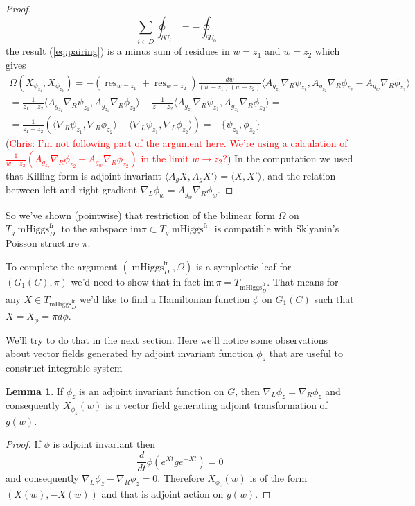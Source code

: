 \documentclass[11pt, oneside, reqno]{amsart}
\theoremstyle{definition} \newtheorem{definition}{Definition}[section]
\newtheorem{lemma}[definition]{Lemma}
\theoremstyle{definition} \newtheorem{remark}[definition]{Remark}
\theoremstyle{definition} \newtheorem{remarks}[definition]{Remarks}
\theoremstyle{definition} \newtheorem{question}[definition]{Question}
\theoremstyle{definition} \newtheorem*{note}{Note}
\theoremstyle{definition} \newtheorem{example}[definition]{Example}
\theoremstyle{definition} \newtheorem{examples}[definition]{Examples}
\DeclareMathOperator{\res}{res}
\DeclareMathOperator{\mhiggs}{mHiggs}
\newcommand{\fr}{\mathrm{fr}}
\newcommand{\chris}[1]{(\textcolor{red}{Chris: #1})}
\begin{document}
\begin{proof}
\begin{equation}
  \sum_{i \in \tilde D} \oint_{\partial U_i }  = - \oint_{\partial U_0} 
\end{equation}
the result (\ref{eq:pairing}) is a minus sum of residues in $w = z_1$ and $w = z_2$
which gives
  \begin{multline}
   \Omega(X_{\psi_{z_1}}, X_{\phi_{z_2}}) = - (\res_{w = z_1}  + \res_{w = z_2}) \frac{dw }{(w - z_1)(w - z_2)} \langle A_{g_{z_1}} \nabla_{R} \psi_{z_1},
   A_{g_{z_2}} \nabla_{R} \phi_{z_2}  - A_{g_w} \nabla_{R} \phi_{z_2} \rangle \\
   =   \frac{1}{z_1 - z_2}  \langle A_{g_{z_1}} \nabla_{R} \psi_{z_1} , A_{g_{z_1}} \nabla_{R} \phi_{z_2}\rangle   - \frac{1}{z_1 - z_2}  \langle A_{g_{z_1}} \nabla_{R} \psi_{z_1} , A_{g_{z_2}} \nabla_{R} \phi_{z_2} \rangle =\\
   = \frac{1}{z_1 - z_2} (\langle \nabla_{R} \psi_{z_1} , \nabla_{R} \phi_{z_2}\rangle - 
   \langle  \nabla_{L} \psi_{z_1} , \nabla_{L} \phi_{z_2} \rangle ) =
   - \{\psi_{z_1}, \phi_{z_2} \} 
  \end{multline}
  \chris{I'm not following part of the argument here.  We're using a calculation of $\frac 1{w-z_2}(A_{g_{z_2}} \nabla_{R} \phi_{z_2}  - A_{g_w} \nabla_{R} \phi_{z_2})$ in the limit $w\to z_2$?}
In the computation we used that Killing form is adjoint invariant
$\langle A_{g} X, A_{g} X' \rangle = \langle X, X' \rangle $,
and the relation between left and right gradient $\nabla_{L} \phi_{w} = A_{g_w} \nabla_{R} \phi_w$.
\end{proof}

So we've shown (pointwise) that restriction of the bilinear form $\Omega$ on $T_g\mhiggs^{\fr}_{D}$
  to the subspace $\mathrm{im} \pi \subset T_g\mhiggs^{\fr}$ is compatible with
Sklyanin's Poisson structure $\pi$.

To complete the argument  $(\mhiggs^{\fr}_{D}, \Omega)$ is
a symplectic leaf for $(G_1(C), \pi)$ we'd need to show that in fact
$\mathrm{im} \, \pi = T_{\mhiggs^{\fr}_{D}}$.
That means for any $X \in T_{\mhiggs^{\fr}_{D}} $ we'd like to find a Hamiltonian
function $\phi$ on $G_1(C)$ such that $X = X_{\phi} = \pi d \phi$.

We'll try to do that in the next section. Here we'll notice some observations
about vector fields generated by adjoint invariant function $\phi_z$ that are useful
to construct integrable system 
\begin{lemma}
 If $\phi_z$ is an adjoint invariant function on $G$, then
$\nabla_{L} \phi_z  = \nabla_{R} \phi_z$ and consequently $X_{\phi_z}(w)$ is
a vector field generating adjoint transformation of $g(w)$. 
\end{lemma}
\begin{proof}
  If $\phi$ is adjoint invariant then
  \begin{equation}
    \frac{d}{dt} \phi(e^{Xt} g e^{-Xt}) = 0
  \end{equation}
  and consequently $\nabla_{L} \phi_z - \nabla_{R} \phi_z  = 0$. Therefore $X_{\phi_z}(w)$ is
  of the form $(X(w), -X(w))$ and that is adjoint action on $g(w)$. 
\end{proof}
\end{document}
